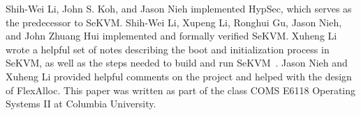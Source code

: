 Shih-Wei Li, John S. Koh, and Jason Nieh implemented HypSec, which serves as
the predecessor to SeKVM. Shih-Wei Li, Xupeng Li, Ronghui Gu, Jason Nieh, and
John Zhuang Hui implemented and formally verified SeKVM. Xuheng Li wrote a
helpful set of notes describing the boot and initialization process in SeKVM,
as well as the steps needed to build and run SeKVM~\cite{xuheng}. Jason Nieh and
Xuheng Li provided helpful comments on the project and helped with the design
of FlexAlloc. This paper was written as part of the class COMS E6118 Operating
Systems II at Columbia University.










